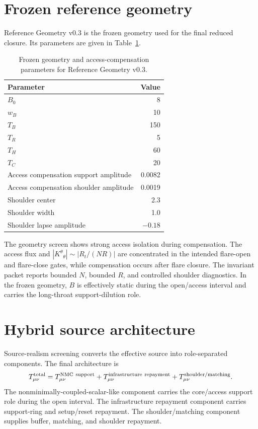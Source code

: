 \documentclass[11pt]{article}
\begin{document}
\section{Frozen reference geometry}

Reference Geometry v0.3 is the frozen geometry used for the final reduced closure.  Its parameters are given in Table~\ref{tab:geom_params}.

\begin{table}[ht]
\centering
\caption{Frozen geometry and access-compensation parameters for Reference Geometry v0.3.}
\label{tab:geom_params}
\begin{tabular}{lr}
\toprule
Parameter & Value \\
\midrule
$B_0$ & 8 \\
$w_B$ & 10 \\
$T_B$ & 150 \\
$T_R$ & 5 \\
$T_H$ & 60 \\
$T_C$ & 20 \\
Access compensation support amplitude & 0.0082 \\
Access compensation shoulder amplitude & 0.0019 \\
Shoulder center & 2.3 \\
Shoulder width & 1.0 \\
Shoulder lapse amplitude & $-0.18$ \\
\bottomrule
\end{tabular}
\end{table}

The geometry screen shows strong access isolation during compensation.  The access flux and $|K^\theta{}_{\theta}|\sim |R_t/(NR)|$ are concentrated in the intended flare-open and flare-close gates, while compensation occurs after flare closure.  The invariant packet reports bounded $N$, bounded $R$, and controlled shoulder diagnostics.  In the frozen geometry, $B$ is effectively static during the open/access interval and carries the long-throat support-dilution role.

\section{Hybrid source architecture}

Source-realism screening converts the effective source into role-separated components.  The final architecture is
\begin{equation}
 T_{\mu\nu}^{\rm total}
 =
 T_{\mu\nu}^{\rm NMC\ support}
 +
 T_{\mu\nu}^{\rm infrastructure\ repayment}
 +
 T_{\mu\nu}^{\rm shoulder/matching}.
 \label{eq:hybrid_source}
\end{equation}
The nonminimally-coupled-scalar-like component carries the core/access support role during the open interval.  The infrastructure repayment component carries support-ring and setup/reset repayment.  The shoulder/matching component supplies buffer, matching, and shoulder repayment.
\end{document}
